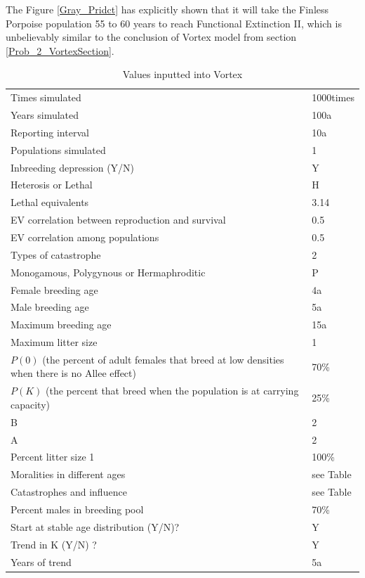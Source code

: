 \documentclass{mcmthesis}
\numberwithin{figure}{section}
\numberwithin{table}{section}
\numberwithin{equation}{section}
\begin{document}
The Figure \ref{Gray_Pridct} has explicitly shown that it will take
the Finless Porpoise population 55 to 60 years to reach Functional
Extinction II, which is unbelievably similar to the conclusion of
Vortex model from section \ref{Prob_2_VortexSection}.

\begin{table}[htpb!]
  \centering
  \caption{Values inputted into Vortex\citep{Zhangxianfeng}} \label{Vortex_in}
  \begin{tabular}{m{12.5cm}<{\centering}|m{2.5cm}<{\centering}}
    \toprule[1.5pt]
    Times simulated & 1000times \\
    Years simulated & 100a \\
    Reporting interval &  10a\\
    Populations simulated  & 1\\ 
    Inbreeding depression (Y/N)  & Y \\
    Heterosis or Lethal  & H \\
    Lethal equivalents  &  3.14 \\
    EV correlation between reproduction and survival & 0.5 \\
    EV correlation among populations & 0.5 \\
    Types of catastrophe & 2 \\ 
    Monogamous, Polygynous or Hermaphroditic & P \\
    Female breeding age & 4a\\
    Male breeding age & 5a\\
    Maximum breeding age & 15a\\
    Maximum litter size & 1\\
    $ P(0) $ (the percent 
    of adult females that breed at low densities when there is no Allee effect)  & 70\% \\
    $ P(K) $ (the percent that 
    breed when the population is at carrying capacity) & 25\% \\
    B & 2\\
    A & 2\\
    Percent litter size 1& 100\%\\
    Moralities in different ages & see Table \\
    Catastrophes and influence & see Table \\
    Percent males in breeding pool & 70\% \\
    Start at stable age distribution (Y/N)? & Y \\
    Trend in K (Y/N) ? & Y \\
    Years of trend & 5a\\
  \end{tabular}
\end{table}
\end{document}
